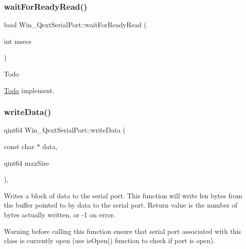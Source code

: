 \mbox{\label{class_win___qext_serial_port_aa089a2a66d8d4fa3a3ce4c99c9c7e30f}} 
\subsubsection{\texorpdfstring{wait\+For\+Ready\+Read()}{waitForReadyRead()}}
{\footnotesize\ttfamily bool Win\+\_\+\+Qext\+Serial\+Port\+::wait\+For\+Ready\+Read (\begin{DoxyParamCaption}\item[{int}]{msecs }\end{DoxyParamCaption})\hspace{0.3cm}{\ttfamily [virtual]}}

\begin{DoxyRefDesc}{Todo}
\item[\mbox{\hyperlink{todo__todo000006}{Todo}}]implement. \end{DoxyRefDesc}
\mbox{\label{class_win___qext_serial_port_abe7e2c0f77000edfcf814fccae66fcd9}} 
\subsubsection{\texorpdfstring{write\+Data()}{writeData()}}
{\footnotesize\ttfamily qint64 Win\+\_\+\+Qext\+Serial\+Port\+::write\+Data (\begin{DoxyParamCaption}\item[{const char $\ast$}]{data,  }\item[{qint64}]{max\+Size }\end{DoxyParamCaption})\hspace{0.3cm}{\ttfamily [protected]}, {\ttfamily [virtual]}}

Writes a block of data to the serial port. This function will write len bytes from the buffer pointed to by data to the serial port. Return value is the number of bytes actually written, or -\/1 on error.

\begin{DoxyWarning}{Warning}
before calling this function ensure that serial port associated with this class is currently open (use is\+Open() function to check if port is open). 
\end{DoxyWarning}


